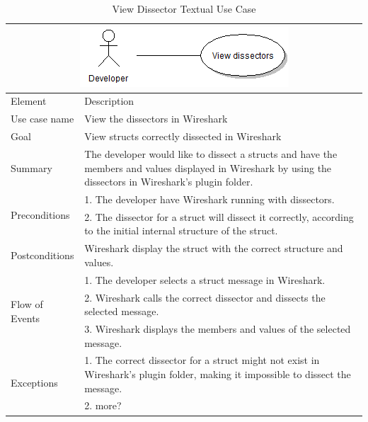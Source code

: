 \begin{table}[htbp] \footnotesize \center
\caption{View Dissector Textual Use Case\label{tab:textual:viewdissector}}
\begin{tabularx}{\textwidth}{l X}
	 \multicolumn{2}{c}{\includegraphics[scale=0.8]{./planning/img/uc_viewdissectors}} \\
	\toprule
	Element & Description\\
	\midrule
	Use case name & View the dissectors in Wireshark\\
	Goal & View structs correctly dissected in Wireshark\\
	Summary & The developer would like to dissect a structs and have the members and values displayed in Wireshark by using the dissectors in Wireshark's plugin folder.\\
	\multirow{2}{*}{Preconditions}& 1. The developer have Wireshark running with dissectors. \\
	& 2. The dissector for a struct will dissect it correctly, according to the initial internal structure of the struct. \\
	Postconditions & Wireshark display the struct with the correct structure and values.\\
	\midrule
	\multirow{3}{*}{Flow of Events} & 1. The developer selects a struct message in Wireshark. \\
	& 2. Wireshark calls the correct dissector and dissects the selected message. \\
	& 3. Wireshark displays the members and values of the selected message. \\
	\midrule
	\multirow{2}{*}{Exceptions} & 1. The correct dissector for a struct might not exist in Wireshark's plugin folder, making it impossible to dissect the message. \\
	& 2. more? \\ %
	\bottomrule
\end{tabularx}
\end{table}

